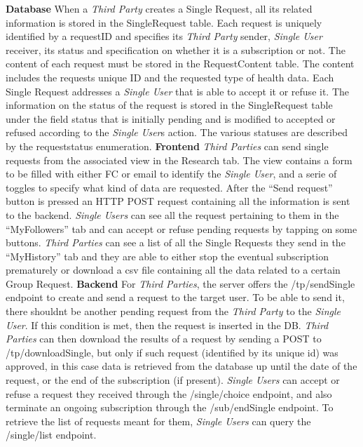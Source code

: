 \documentclass[titlepage]{article}
\begin{document}
	\noindent
	{\bf Database} \newline
	When a {\it Third Party} creates a Single Request, all its related information is stored in the SingleRequest table. Each request is uniquely identified by a requestID and specifies its {\it Third Party} sender, {\it Single User} receiver, its status and specification on whether it is a subscription or not. The content of each request must be stored in the RequestContent table. The content includes the request\textsc{}s unique ID and the requested type of health data.
	Each Single Request addresses a {\it Single User} that is able to accept it or refuse it. The information on the status of the request is stored in the SingleRequest table under the field status that is initially pending and is modified to accepted or refused according to the {\it Single User}\textsc{}s action. The various statuses are described by the requeststatus enumeration.
	\newline
	\newline
	\noindent
	{\bf Frontend} \newline
	{\it Third Parties} can send single requests from the associated view in the Research tab. The view contains a form to be filled with either FC or email to identify the {\it Single User}, and a serie of toggles to specify what kind of data are requested. After the “Send request” button is pressed an HTTP POST request containing all the information is sent to the backend.
	{\it Single Users} can see all the request pertaining to them in the “MyFollowers” tab and can accept or refuse pending requests by tapping on some buttons. {\it Third Parties} can see a list of all the Single Requests they send in the “MyHistory” tab and they are able to either stop the eventual subscription prematurely or download a csv file containing all the data related to a certain Group Request. 
	\newline
	\newline
	\noindent
	{\bf Backend} \newline
	For {\it Third Parties}, the server offers the /tp/sendSingle endpoint to create and send a request to the target user. To be able to send it, there shouldn\textsc{}t be another pending request from the {\it Third Party} to the {\it Single User}. If this condition is met, then the request is inserted in the DB. {\it Third Parties} can then download the results of a request by sending a POST to /tp/downloadSingle, but only if such request (identified by its unique id) was approved, in this case data is retrieved from the database up until the date of the request, or the end of the subscription (if present).
	{\it Single Users} can accept or refuse a request they received through the /single/choice endpoint, and also terminate an ongoing subscription through the /sub/endSingle endpoint. To retrieve the list of requests meant for them, {\it Single Users} can query the /single/list endpoint.
	
\end{document}
